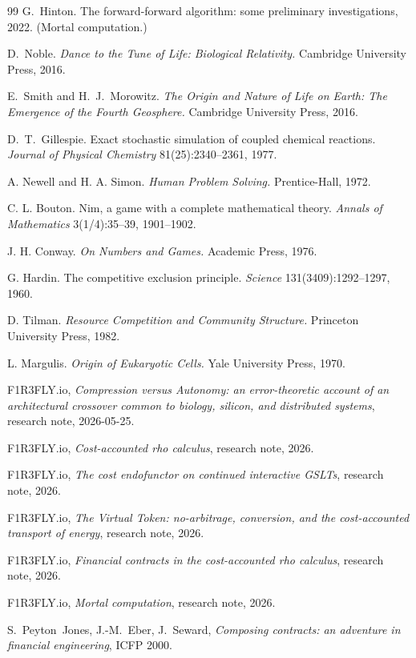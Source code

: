 \begin{thebibliography}{99}
G.\ Hinton. The forward-forward algorithm: some preliminary investigations, 2022. (Mortal computation.)

D.\ Noble. \emph{Dance to the Tune of Life: Biological Relativity.} Cambridge University Press, 2016.

E.\ Smith and H.\ J.\ Morowitz. \emph{The Origin and Nature of Life on Earth: The Emergence of the Fourth Geosphere.} Cambridge University Press, 2016.

D.\ T.\ Gillespie. Exact stochastic simulation of coupled chemical reactions. \emph{Journal of Physical Chemistry} 81(25):2340--2361, 1977.

A. Newell and H. A. Simon. \emph{Human Problem Solving.} Prentice-Hall, 1972.

C. L. Bouton. Nim, a game with a complete mathematical theory. \emph{Annals of Mathematics} 3(1/4):35--39, 1901--1902.

J. H. Conway. \emph{On Numbers and Games.} Academic Press, 1976.

G. Hardin. The competitive exclusion principle. \emph{Science} 131(3409):1292--1297, 1960.

D. Tilman. \emph{Resource Competition and Community Structure.} Princeton University Press, 1982.

L. Margulis. \emph{Origin of Eukaryotic Cells.} Yale University Press, 1970.

F1R3FLY.io, \emph{Compression versus Autonomy: an error-theoretic account of an architectural crossover common to biology, silicon, and distributed systems}, research note, 2026-05-25.

F1R3FLY.io, \emph{Cost-accounted rho calculus}, research note, 2026.

F1R3FLY.io, \emph{The cost endofunctor on continued interactive GSLTs}, research note, 2026.

F1R3FLY.io, \emph{The Virtual Token: no-arbitrage, conversion, and the cost-accounted transport of energy}, research note, 2026.

F1R3FLY.io, \emph{Financial contracts in the cost-accounted rho calculus}, research note, 2026.

F1R3FLY.io, \emph{Mortal computation}, research note, 2026.

S.~Peyton~Jones, J.-M.~Eber, J.~Seward, \emph{Composing contracts: an adventure in financial engineering}, ICFP 2000.


\end{thebibliography}
